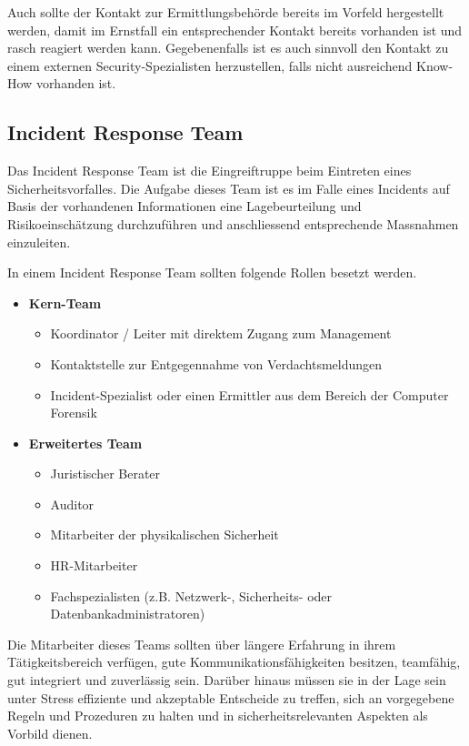 Auch sollte der Kontakt zur Ermittlungsbehörde bereits im Vorfeld hergestellt werden, damit im Ernstfall ein entsprechender Kontakt bereits vorhanden ist und rasch reagiert werden kann. Gegebenenfalls ist es auch sinnvoll den Kontakt zu einem externen Security-Spezialisten herzustellen, falls nicht ausreichend Know-How vorhanden ist.

\subsection{Incident Response Team}
Das Incident Response Team ist die Eingreiftruppe beim Eintreten eines Sicherheitsvorfalles. Die Aufgabe dieses Team ist es im Falle eines Incidents auf Basis der vorhandenen Informationen eine Lagebeurteilung und Risikoeinschätzung durchzuführen und anschliessend entsprechende Massnahmen einzuleiten.

In einem Incident Response Team sollten folgende Rollen besetzt werden.

\begin{itemize}
\item \textbf{Kern-Team} \\
\begin{itemize}
\item Koordinator / Leiter mit direktem Zugang zum Management
\item Kontaktstelle zur Entgegennahme von Verdachtsmeldungen
\item Incident-Spezialist oder einen Ermittler aus dem Bereich der Computer Forensik
\end{itemize}
\item \textbf{Erweitertes Team} \\
\begin{itemize}
\item Juristischer Berater
\item Auditor
\item Mitarbeiter der physikalischen Sicherheit
\item HR-Mitarbeiter
\item Fachspezialisten (z.B. Netzwerk-, Sicherheits- oder Datenbankadministratoren)
\end{itemize}
\end{itemize}

Die Mitarbeiter dieses Teams sollten über längere Erfahrung in ihrem Tätigkeitsbereich verfügen, gute Kommunikationsfähigkeiten besitzen, teamfähig, gut integriert und zuverlässig sein. Darüber hinaus müssen sie in der Lage sein unter Stress effiziente und akzeptable Entscheide zu treffen, sich an vorgegebene Regeln und Prozeduren zu halten und in sicherheitsrelevanten Aspekten als Vorbild dienen. 

